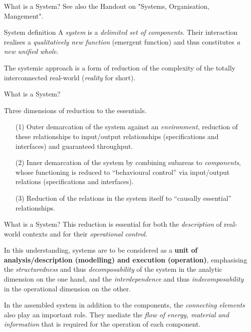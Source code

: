 \documentclass{beamer}
\title{Modelling Sustainable Systems\\ and Semantic Web\\[6pt]
  Systems and their Development
  \vskip1em}
\subtitle{Lecture in the Module 10-202-2312\\ for Master Computer Science}
\author{Prof. Dr. Hans-Gert Gräbe\\
\url{http://www.informatik.uni-leipzig.de/~graebe}}
\date{April 2022}
\begin{document}
{
\begin{frame}
  \titlepage
\end{frame}}

\begin{frame}{What is a System?}
See also the Handout on "Systems, Organisation, Mangement".

  \begin{block}{System definition}
    A \emph{system} is a \emph{delimited set of components}.  Their
    interaction realises a \emph{qualitatively new function} (emergent
    function) and thus constitutes \emph{a new unified whole}.
  \end{block}

The systemic approach is a form of reduction of the complexity of the totally
interconnected real-world (\emph{reality} for short).
\end{frame}

\begin{frame}{What is a System?}
  \begin{block}{Three dimensions of reduction to the essentials.}
    \begin{itemize}
    \item[(1)] Outer demarcation of the system against an \emph{environment},
      reduction of these relationships to input/output relationships
      (specifications and interfaces) and guaranteed throughput.
    \item[(2)] Inner demarcation of the system by combining subareas to
      \emph{components}, whose functioning is reduced to “behavioural control”
      via input/output relations (specifications and interfaces).
    \item[(3)] Reduction of the relations in the system itself to “causally
      essential” relationships.
    \end{itemize}
  \end{block}
\end{frame}

\begin{frame}{What is a System?}
This reduction is essential for both the \emph{description} of real-world
contexts and for their \emph{operational control}.

In this understanding, systems are to be considered as a \textbf{unit of
  analysis/description (modelling) and execution (operation)}, emphasising the
\emph{structuredness} and thus \emph{decomposability} of the system in the
analytic dimension on the one hand, and the \emph{interdependence} and thus
\emph{indecomposability} in the operational dimension on the other.

In the assembled system in addition to the components, the \emph{connecting
  elements} also play an important role.  They mediate the \emph{flow of
  energy, material and information} that is required for the operation of each
component.
\end{frame}
\end{document}
